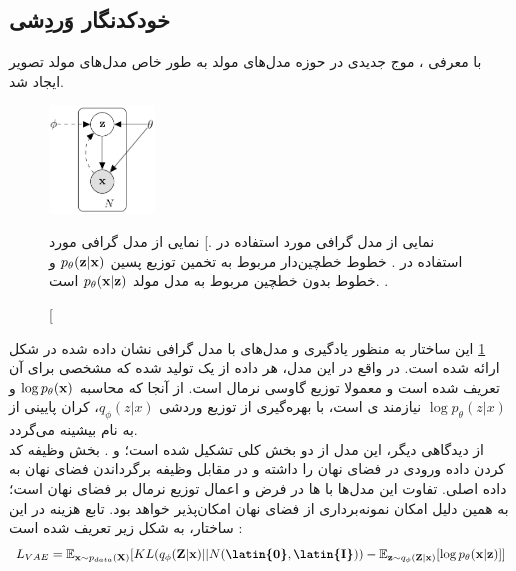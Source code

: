\subsection{خودکدنگار وَردِشی}
با معرفی \vae{}،
موج جدیدی در حوزه مدل‌های مولد به طور خاص مدل‌های مولد تصویر ایجاد شد.
\begin{figure}[H]
	\centering
	\includegraphics[width=0.25\textwidth]{images/vae-pgm.png}
	\caption
    [نمایی از مدل گرافی مورد استفاده در \vae{}.]
    {
		نمایی از مدل گرافی مورد استفاده در \vae{}. خطوط خطچین‌‌دار مربوط به تخمین توزیع پسین $p_\theta({\bf z}|{\bf x})$ و خطوط بدون خطچین مربوط به مدل مولد
		$p_\theta({\bf x}|{\bf z})$
		است.
		\cite{vae_text}.}
	\label{fig:vae-pgm}
\end{figure}
این ساختار به منظور یادگیری و 
مدل‌های با مدل گرافی نشان داده شده در شکل ‎\ref{fig:vae-pgm}‎ ارائه شده است. در واقع در این مدل، هر داده از یک 
  تولید شده که \priordist{} مشخصی برای آن تعریف شده است و معمولا توزیع گاوسی نرمال است. از آنجا که محاسبه $\log p_\theta({\bf x})$ و $\log p_\theta (z|x)$ نیازمند \inference ی 
است، با بهره‌گیری از  توزیع وردشی $q_\phi(z|x)$، کران پایینی از \likelihood{} به نام  بیشینه می‌گردد.\\
از دیدگاهی دیگر، این مدل از دو بخش کلی تشکیل شده است؛ \encoder{} و \decoder{}. بخش \encoder{} وظیفه کد کردن داده ورودی در فضای نهان را داشته و در مقابل \decoder{} وظیفه برگرداندن فضای نهان به داده اصلی. تفاوت این مدل‌ها با \autoencoder{}ها در فرض و اعمال توزیع نرمال بر فضای نهان است؛ به همین دلیل امکان نمونه‌برداری از فضای نهان امکان‌پذیر خواهد بود. تابع هزینه در این ساختار، به شکل زیر تعریف شده است \cite{vae}:
\begin{equation} \label{eq:vae}
	\begin{split}
		L_{VAE} = \expected_{\bff{x} \sim p_{data}(\bff{X})} [KL(q_\phi(\bff{Z}|\bff{x}) || N(\textbf{\latin{0}},\textbf{\latin{I}}))- \expected_{\bff{z} \sim q_\phi(\bff{Z}|\bff{x})}[\log p_\theta(\bff{x}|\bff{z})]]
	\end{split}
\end{equation}
